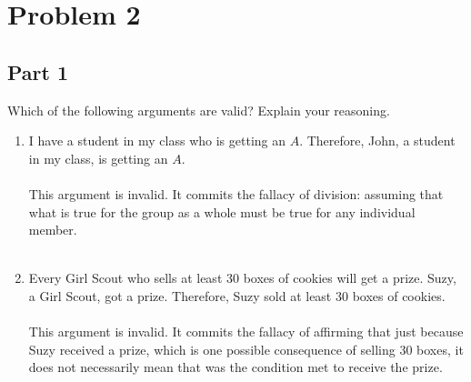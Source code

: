 \documentclass{amsart}
\theoremstyle{definition}
\theoremstyle{Exercise}
\theoremstyle{remark}
\theoremstyle{rule}
\numberwithin{equation}{section}
\begin{document}
 \newpage

\section*{Problem 2}
\subsection*{Part 1}

 Which of the following arguments are valid? Explain your reasoning.\\
 \begin{enumerate}[label=(\alph*)]
\item I have a student in my class who is getting an $A$. Therefore, John, a student in my class, is getting an $A$. \\\\
This argument is invalid. It commits the fallacy of division: assuming that what is true for the group as a whole must be true for any individual member.
\\\\
\item Every Girl Scout who sells at least 30 boxes of cookies will get a prize. Suzy, a Girl Scout, got a prize. Therefore, Suzy sold at least 30 boxes of cookies.\\\\
This argument is invalid. It commits the fallacy of affirming that just because Suzy received a prize, which is one possible consequence of selling 30 boxes, it does not necessarily mean that was the condition met to receive the prize.
\\\\
 \end{enumerate}
\end{document}
